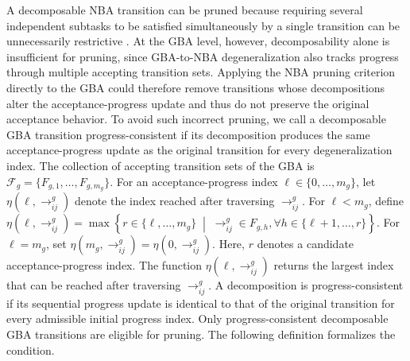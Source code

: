\documentclass[lettersize,journal]{IEEEtran}
\theoremstyle{italiclemma}
\theoremstyle{italiclemma}
\theoremstyle{definition}
\begin{document}
A decomposable NBA transition can be pruned because requiring several independent subtasks to be satisfied simultaneously by a single transition can be unnecessarily restrictive \cite{liu2024time}. At the GBA level, however, decomposability alone is insufficient for pruning, since GBA-to-NBA degeneralization also tracks progress through multiple accepting transition sets. Applying the NBA pruning criterion directly to the GBA could therefore remove transitions whose decompositions alter the acceptance-progress update and thus do not preserve the original acceptance behavior. To avoid such incorrect pruning, we call a decomposable GBA transition progress-consistent if its decomposition produces the same acceptance-progress update as the original transition for every degeneralization index.
The collection of accepting transition sets of the GBA is  $\mathcal{F}_g=\{F_{g,1},\ldots,F_{g,m_g}\}$. For an acceptance-progress index \(\ell\in\{0,\ldots,m_g\}\),  let
\(\eta(\ell,\rightarrow^g_{ij})\) denote the index reached after traversing \(\rightarrow^g_{ij}\). For \(\ell<m_g\),  define $ \eta(\ell,\rightarrow^g_{ij}) =\max\left\{ r\in\{\ell,\ldots,m_g\}\;\middle|\;\rightarrow^g_{ij}\in F_{g,h},  \forall h\in\{\ell+1,\ldots,r\}\right\}$. For \(\ell=m_g\), set $\eta(m_g,\rightarrow^g_{ij})=\eta(0,\rightarrow^g_{ij}).$ Here, $r$ denotes a candidate acceptance-progress index. The function
$\eta(\ell,\rightarrow^g_{ij})$ returns the largest index that can be reached after traversing \(\rightarrow^g_{ij}\). A decomposition is progress-consistent if its sequential progress update is identical to that of the original transition for every admissible initial progress index. Only progress-consistent decomposable
GBA transitions are eligible for pruning. The following definition formalizes the condition.

\end{document}
